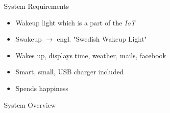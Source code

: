 \documentclass[apectratio=169]{beamer}
\begin{document}
  	\begin{frame}{System Requirements}
		\begin{itemize}
			\item<1-> Wakeup light which is a part of the \textit{IoT}
			\item<2-> Swakeup \ensuremath{\rightarrow} engl. "Swedish Wakeup Light"
			\item<3-> Wakes up, displays time, weather, mails, facebook
			\item<4-> Smart, small, USB charger included
			\item<5-> \alert<5->{Spends happiness}
		\end{itemize}
  	\end{frame}
  	\begin{frame}{System Overview}	
		\begin{figure}
			\centering

\end{figure}
\end{frame}
\end{document}
